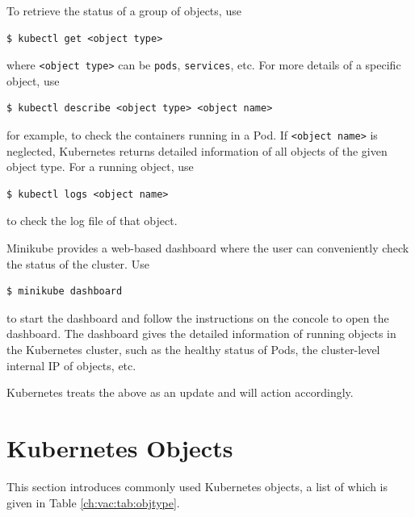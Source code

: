 To retrieve the status of a group of objects, use
\begin{lstlisting}
$ kubectl get <object type>
\end{lstlisting}
where \verb|<object type>| can be \verb|pods|, \verb|services|, etc. For more details of a specific object, use
\begin{lstlisting}
$ kubectl describe <object type> <object name>
\end{lstlisting}
for example, to check the containers running in a Pod. If \verb|<object name>| is neglected, Kubernetes returns detailed information of all objects of the given object type. For a running object, use
\begin{lstlisting}
$ kubectl logs <object name>
\end{lstlisting}
to check the log file of that object.

Minikube provides a web-based dashboard where the user can conveniently check the status of the cluster. Use
\begin{lstlisting}
$ minikube dashboard
\end{lstlisting} 
to start the dashboard and follow the instructions on the concole to open the dashboard. The dashboard gives the detailed information of running objects in the Kubernetes cluster, such as the healthy status of Pods, the cluster-level internal IP of objects, etc.


Kubernetes treats the above as an update and will action accordingly.

\section{Kubernetes Objects} \label{ch:vac:sec:objects}

This section introduces commonly used Kubernetes objects, a list of which is given in Table \ref{ch:vac:tab:objtype}.

